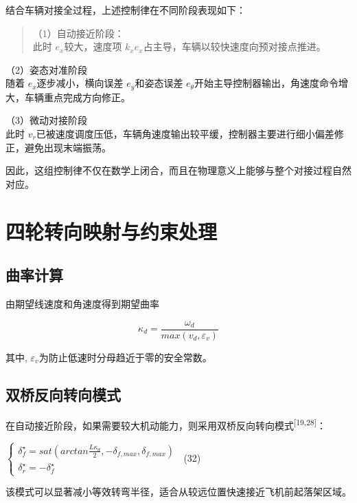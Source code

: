 结合车辆对接全过程，上述控制律在不同阶段表现如下：

\begin{quote}
（1）自动接近阶段：\\
此时 \(e_{x}\)较大，速度项
\(k_{x}e_{x}\)占主导，车辆以较快速度向预对接点推进。
\end{quote}

（2）姿态对准阶段\\
随着 \(e_{x}\)逐步减小，横向误差 \(e_{y}\)和姿态误差
\(e_{\theta}\)开始主导控制器输出，角速度命令增大，车辆重点完成方向修正。

（3）微动对接阶段\\
此时
\(v_{r}\)已被速度调度压低，车辆角速度输出较平缓，控制器主要进行细小偏差修正，避免出现末端振荡。

因此，这组控制律不仅在数学上闭合，而且在物理意义上能够与整个对接过程自然对应。

\section{四轮转向映射与约束处理}

\subsection{曲率计算}

由期望线速度和角速度得到期望曲率

\begin{equation}
\kappa_{d} = \frac{\omega_{d}}{max(v_{d},\varepsilon_{v})}
\tag{31}
\label{eq:31}
\end{equation}

其中, \(\varepsilon_{v}\)为防止低速时分母趋近于零的安全常数。

\subsection{双桥反向转向模式}

在自动接近阶段，如果需要较大机动能力，则采用双桥反向转向模式\textsuperscript{[19,28]}：

\(\left\{ \begin{array}{r}
\delta_{f}^{\star} = sat\left( arctan\frac{L\kappa_{d}}{2}, - \delta_{f,max},\delta_{f,max} \right) \\
\delta_{r}^{\star} = - \delta_{f}^{\star}
\end{array} \right.\ \) (32)

该模式可以显著减小等效转弯半径，适合从较远位置快速接近飞机前起落架区域。

